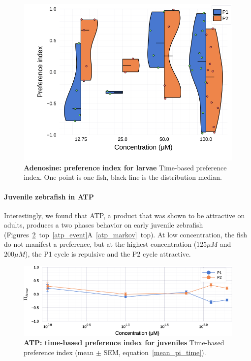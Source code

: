   \begin{figure}[h!]
      \centering
      \includegraphics[width=1\textwidth]{part_2/assets/dist_adenosine_lar.png}
      \caption{\textbf{Adenosine: preference index for larvae} Time-based preference index. One point is one fish, black line is the distribution median.}
      \label{dist_adenosine_lar}
    \end{figure}

  \paragraph{Juvenile zebrafish in ATP} Interestingly, we found that ATP, a product that was shown to be attractive on adults, produces a two phases behavior on early juvenile zebrafish (Figures~\ref{atp}~top~\ref{atp_event}A~\ref{atp_markov}~top). At low concentration, the fish do not manifest a preference, but at the highest concentration ($125 \mu  M$  and $200 \mu M$), the P1 cycle is repulsive and the P2 cycle attractive.

    \begin{figure}[h!]
      \centering
      \includegraphics[width=1\textwidth]{part_2/assets/atp.png}
      \caption{\textbf{ATP: time-based preference index for juveniles} Time-based preference index (mean $\pm$ SEM, equation~\ref{mean_pi_time}).}
      \label{atp}
    \end{figure}

